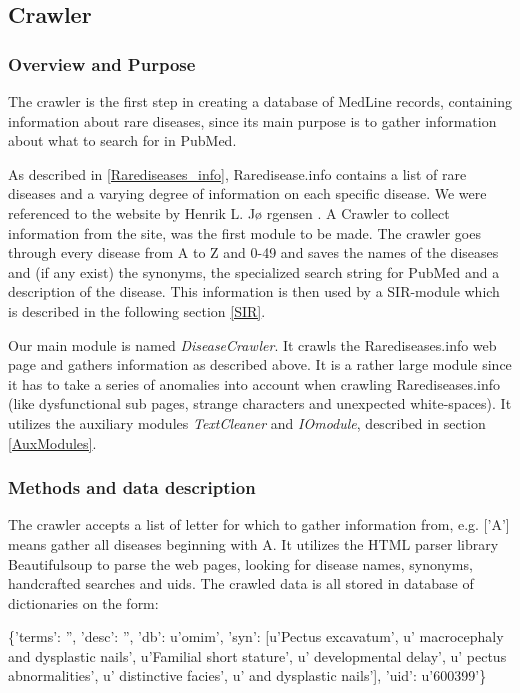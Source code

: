 \subsection{Crawler\label{Crawler}}

\subsubsection{Overview and Purpose}
The crawler is the first step in creating a database of MedLine
records, containing information about rare diseases, since its main
purpose is to gather information about what to search for in PubMed.

As described in \ref{Rarediseases_info}, Raredisease.info contains a
list of rare diseases and a varying degree of information on each
specific disease. We were referenced to the website by Henrik L.  J\o
rgensen \cite{TheDude}. A Crawler to collect information from the
site, was the first module to be made. The crawler goes through every
disease from A to Z and 0-49 and saves the names of the diseases and
(if any exist) the synonyms, the specialized search string for PubMed
and a description of the disease. This information is then used by a
SIR-module which is described in the following section \ref{SIR}.

Our main module is named \textit{DiseaseCrawler}. It crawls the
Rarediseases.info web page and gathers information as described
above. It is a rather large module since it has to take a series of
anomalies into account when crawling Rarediseases.info (like
dysfunctional sub pages, strange characters and unexpected
white-spaces). It utilizes the auxiliary modules \textit{TextCleaner}
and \textit{IOmodule}, described in section \ref{AuxModules}.


\subsubsection{Methods and data description}
The crawler accepts a list of letter for which to gather information
from, e.g. ['A'] means gather all diseases beginning with A. It
utilizes the HTML parser library Beautifulsoup \cite{BS} to parse the
web pages, looking for disease names, synonyms, handcrafted searches
and uids. The crawled data is all stored in database of dictionaries
on the form:

\begin{center}
{\small
\{'terms': '', 'desc': '', 'db': u'omim', 'syn': [u'Pectus excavatum', u' macrocephaly and dysplastic nails', u'Familial short stature', u' developmental delay', u' pectus abnormalities', u' distinctive facies', u' and dysplastic nails'], 'uid': u'600399'\} 
}
\end{center}

